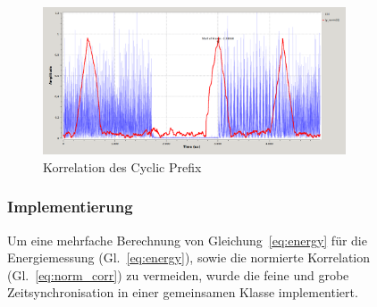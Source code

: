 \begin{figure}[h]
\centering
  \includegraphics[width=0.8\textwidth]{figures/delayed_correlation_abs_and_energy.png}
	\caption{Korrelation des Cyclic Prefix}
	\label{fig:corr}
\end{figure}

\subsubsection{Implementierung}
Um eine mehrfache Berechnung von Gleichung~\ref{eq:energy} für die Energiemessung (Gl.~\ref{eq:energy}), sowie die normierte Korrelation (Gl.~\ref{eq:norm_corr}) zu vermeiden, wurde die feine und grobe Zeitsynchronisation in einer gemeinsamen Klasse implementiert.

